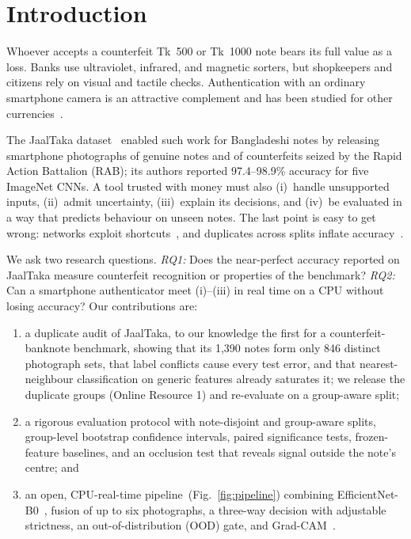 \documentclass[pdflatex,sn-mathphys-num]{sn-jnl}
\begin{document}

\maketitle

\section{Introduction}\label{sec:intro}

Whoever accepts a counterfeit Tk~500 or Tk~1000 note bears its full value as a loss.
Banks use ultraviolet, infrared, and magnetic sorters, but shopkeepers and citizens rely
on visual and tactile checks. Authentication with an ordinary smartphone camera is an
attractive complement and has been studied for other currencies~\cite{pham2020,pham2022}.

The JaalTaka dataset~\cite{piyas2025jaaltaka} enabled such work for Bangladeshi notes by
releasing smartphone photographs of genuine notes and of counterfeits seized by the Rapid
Action Battalion (RAB); its authors reported 97.4--98.9\% accuracy for five ImageNet
CNNs. A tool trusted with money must also (i)~handle unsupported inputs,
(ii)~admit uncertainty, (iii)~explain its decisions, and (iv)~be evaluated in a way that predicts behaviour on
unseen notes. The last point is easy to get wrong: networks exploit
shortcuts~\cite{geirhos2020shortcut}, and duplicates across splits inflate
accuracy~\cite{kaufman2012leakage,barz2020cifair,kapoor2023leakage}.

We ask two research questions. \emph{RQ1:} Does the near-perfect accuracy reported
on JaalTaka measure counterfeit recognition or properties of the benchmark? \emph{RQ2:}
Can a smartphone authenticator meet (i)--(iii) in real time on a CPU without losing
accuracy? Our contributions are:
\begin{enumerate}
\item a duplicate audit of JaalTaka, to our knowledge the first for a
counterfeit-banknote benchmark, showing that its 1{,}390 notes form only 846 distinct
photograph sets, that label conflicts cause every test error, and that nearest-neighbour
classification on generic features already saturates it; we release the duplicate
groups (Online Resource 1) and re-evaluate on a group-aware split;
\item a rigorous evaluation protocol with note-disjoint and group-aware splits,
group-level bootstrap confidence intervals, paired significance tests, frozen-feature
baselines, and an occlusion test that reveals signal outside the note's centre; and
\item an open, CPU-real-time pipeline~(Fig.~\ref{fig:pipeline}) combining
EfficientNet-B0~\cite{tan2019efficientnet}, fusion of up to six photographs, a three-way
decision with adjustable strictness, an out-of-distribution (OOD) gate, and
Grad-CAM~\cite{selvaraju2017gradcam}.
\end{enumerate}
\end{document}
